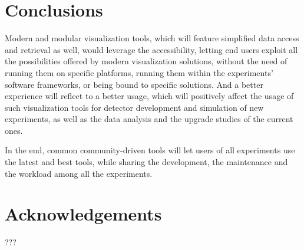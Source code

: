 \documentclass[12pt,a4paper]{article}
\begin{document}
\hypertarget{conclusions}{%
\section{Conclusions}\label{conclusions}}

Modern and modular visualization tools, which will feature simplified data access and retrieval as well, would leverage
the accessibility, letting end users exploit all the possibilities offered by modern visualization solutions, without the need
of running them on specific platforms, running them within the experiments’ software frameworks, or being bound to specific solutions.
And a better experience will reflect to a better usage, which will positively affect the usage of such visualization tools for
detector development and simulation of new experiments, as well as the data analysis and the upgrade studies of the current ones.

In the end, common community-driven tools will let users of all experiments use the latest and best tools, while sharing the development,
the maintenance and the workload among all the experiments.
 
\hypertarget{acknowledgements}{%
\section{Acknowledgements}\label{acknowledgements}}


???

%
\end{document}
